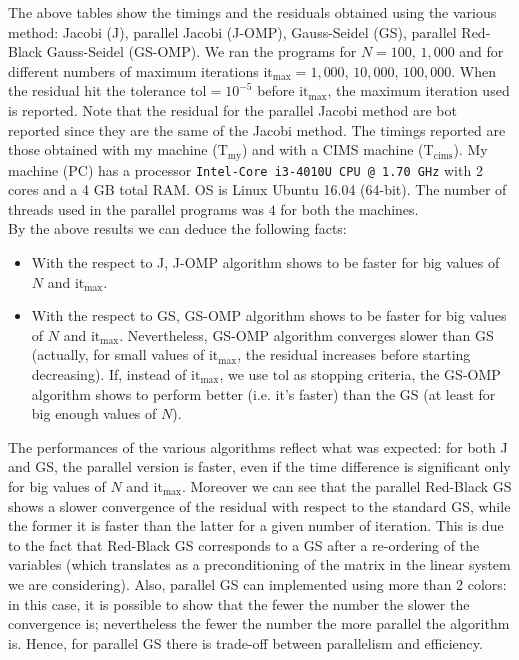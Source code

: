 \documentclass[a4paper,11pt]{article}
\theoremstyle{definition}
\theoremstyle{plain}
\theoremstyle{remark}
\begin{document}
The above tables show the timings and the residuals obtained using the various method: Jacobi (J), parallel Jacobi (J-OMP), Gauss-Seidel (GS), parallel Red-Black Gauss-Seidel (GS-OMP). We ran the programs for $N=100$, $1,000$ and for different numbers of maximum iterations $\text{it}_\text{max} = 1,000$, $10,000$, $100,000$. When the residual hit the tolerance $\mathrm{tol} = 10^{-5}$ before  $\text{it}_\text{max}$, the maximum iteration used is reported. Note that the residual for the parallel Jacobi method are bot reported since they are the same of the Jacobi method. The timings reported are those obtained with my machine ($\text{T}_\text{my}$) and with a CIMS machine ($\text{T}_\text{cims}$). My machine (PC) has a processor \texttt{Intel-Core i3-4010U CPU @ 1.70 GHz} with 2 cores and a 4 GB total RAM. OS is Linux Ubuntu 16.04 (64-bit). The number of threads used in the parallel programs was $4$ for both the machines. \\ 
By the above results we can deduce the following facts:
\begin{itemize}
\item With the respect to J, J-OMP algorithm shows to be faster for big values of $N$ and $\text{it}_\text{max}$.
\item With the respect to GS, GS-OMP algorithm shows to be faster for big values of $N$ and $\text{it}_\text{max}$. Nevertheless, GS-OMP algorithm converges slower than GS (actually, for small values of $\text{it}_\text{max}$, the residual increases before starting decreasing). If, instead of $\text{it}_\text{max}$, we use $\mathrm{tol}$ as stopping criteria, the GS-OMP algorithm shows to perform better (i.e. it's faster) than the GS (at least for big enough values of $N$).
\end{itemize}
The performances of the various algorithms reflect what was expected: for both J and GS, the parallel version is faster, even if the time difference is significant only for big values of $N$ and $\text{it}_\text{max}$. Moreover we can see that the parallel Red-Black GS shows a slower convergence of the residual with respect to the standard GS, while the former it is faster than the latter for a given number of iteration. This is due to the fact that Red-Black GS corresponds to a GS after a re-ordering of the variables (which translates as a preconditioning of the matrix in the linear system we are considering). Also, parallel GS can implemented using more than 2 colors: in this case, it is possible to show that the fewer the number the slower the convergence is; nevertheless the fewer the number the more parallel the algorithm is. Hence, for parallel GS there is trade-off between parallelism and efficiency.
\end{document}
